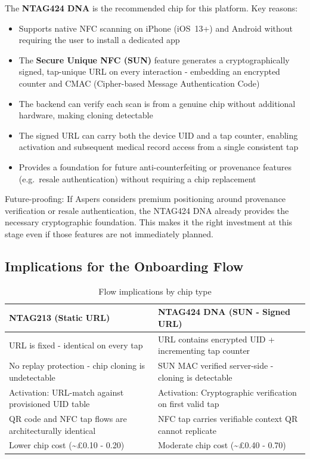 \documentclass[
	a4paper, %
]{ChaosEngineReport}
\begin{document}
The \textbf{NTAG424 DNA} is the recommended chip for this platform. Key reasons:

\begin{itemize}
  \item Supports native NFC scanning on iPhone (iOS~13+) and Android without requiring the user to install a dedicated app
  \item The \textbf{Secure Unique NFC (SUN)} feature generates a cryptographically signed, tap-unique URL on every interaction - embedding an encrypted counter and CMAC (Cipher-based Message Authentication Code)
  \item The backend can verify each scan is from a genuine chip without additional hardware, making cloning detectable
  \item The signed URL can carry both the device UID and a tap counter, enabling activation and subsequent medical record access from a single consistent tap
  \item Provides a foundation for future anti-counterfeiting or provenance features (e.g.\ resale authentication) without requiring a chip replacement
\end{itemize}

\begin{callout_box}{Future-proofing:}
If Aspers considers premium positioning around provenance verification or resale authentication, the NTAG424 DNA already provides the necessary cryptographic foundation. This makes it the right investment at this stage even if those features are not immediately planned.
\end{callout_box}

\subsection{Implications for the Onboarding Flow}

\begin{table}[h!]
\centering
\small
{}
\begin{tabularx}{\linewidth}{@{} X X @{}}
  \toprule
  \textbf{NTAG213 (Static URL)} &
  \textbf{NTAG424 DNA (SUN - Signed URL)} \\
  \midrule
   URL is fixed - identical on every tap & URL contains encrypted UID + incrementing tap counter \\
  No replay protection - chip cloning is undetectable & SUN MAC verified server-side - cloning is detectable \\
   Activation: URL-match against provisioned UID table & Activation: Cryptographic verification on first valid tap \\
  QR code and NFC tap flows are architecturally identical & NFC tap carries verifiable context QR cannot replicate \\
   Lower chip cost (\textasciitilde£0.10 - 0.20) & Moderate chip cost (\textasciitilde£0.40 - 0.70) \\
\end{tabularx}
\caption{Flow implications by chip type}
\end{table}
\end{document}

